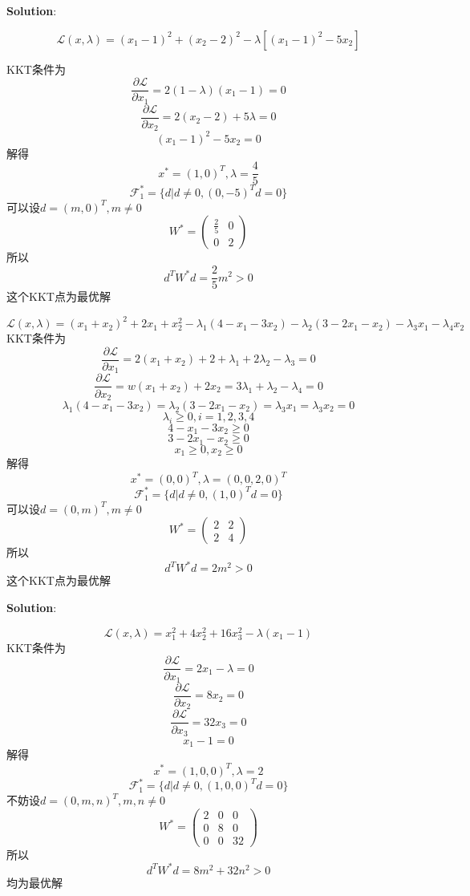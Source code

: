 \documentclass[a4 paper]{article}
\begin{document}

\textbf{Solution}:


$$\mathcal{L}(x,\lambda) =(x_1-1)^2+(x_2-2)^2-\lambda[(x_1-1)^2-5x_2]$$

KKT条件为
$$\frac{\partial \mathcal{L}}{\partial x_1}=2(1-\lambda)(x_1-1)=0$$
$$\frac{\partial \mathcal{L}}{\partial x_2}=2(x_2-2)+5\lambda=0$$
$$(x_1-1)^2-5x_2=0$$
解得
$$x^\ast=(1,0)^T,\lambda=\frac{4}{5}$$
$$\mathcal{F}_1^\ast=\{d|d\neq 0,(0,-5)^Td=0\}$$ 
可以设$d=(m,0)^T,m\neq 0$
$$W^\ast=\begin{pmatrix}\frac{2}{5}& 0\\0& 2\end{pmatrix}$$
所以 $$ d^T W^\ast d=\frac{2}{5} m^2>0$$
这个KKT点为最优解


$$\mathcal{L}(x,\lambda) =(x_1+x_2)^2+2x_1+x_2^2-\lambda_1(4-x_1-3x_2)-\lambda_2(3-2x_1-x_2)-\lambda_3 x_1-\lambda_4 x_2$$
KKT条件为
$$\frac{\partial \mathcal{L}}{\partial x_1}=2(x_1+x_2)+2+\lambda_1+2\lambda_2-\lambda_3=0$$
$$\frac{\partial \mathcal{L}}{\partial x_2}=w(x_1+x_2)+2x_2=3\lambda_1+\lambda_2-\lambda_4=0$$
$$\lambda_1(4-x_1-3x_2)=\lambda_2(3-2x_1-x_2)=\lambda_3 x_1=\lambda_3 x_2=0$$
$$\lambda_i\geqslant 0  , i=1,2,3,4$$
$$4-x_1-3x_2\geqslant 0$$
$$3-2x_1-x_2 \geqslant 0$$
$$x_1 \geqslant 0,x_2 \geqslant 0$$
解得
$$x^\ast=(0,0)^T,\lambda=(0,0,2,0)^T$$
$$\mathcal{F}_1^\ast=\{d|d\neq 0,(1,0)^Td=0\}$$ 
可以设$d=(0,m)^T,m\neq 0$
$$W^\ast=\begin{pmatrix}2& 2\\2& 4\end{pmatrix}$$
所以 $$ d^T W^\ast d=2 m^2>0$$
这个KKT点为最优解

\textbf{Solution}:


$$\mathcal{L}(x,\lambda) =x_1^2+4x_2^2+16x_3^2-\lambda(x_1-1)$$
KKT条件为
$$\frac{\partial \mathcal{L}}{\partial x_1}=2x_1-\lambda=0$$
$$\frac{\partial \mathcal{L}}{\partial x_2}=8x_2=0$$
$$\frac{\partial \mathcal{L}}{\partial x_3}=32x_3=0$$
$$x_1-1=0$$
解得
$$x^\ast=(1,0,0)^T,\lambda=2$$
$$\mathcal{F}_1^\ast=\{d|d\neq 0,(1,0,0)^Td=0\}$$
不妨设$d=(0,m,n)^T,m,n\neq 0$
$$W^\ast=\begin{pmatrix}2& 0 & 0\\0& 8 & 0\\0&0&32\end{pmatrix}$$
所以 $$ d^T W^\ast d=8m^2+32n^2>0$$
均为最优解
\end{document}
